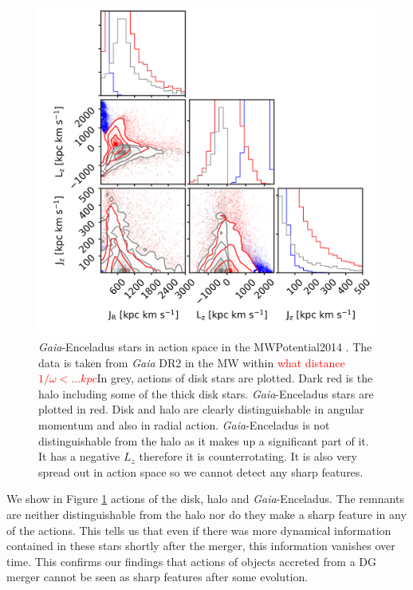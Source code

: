 \begin{figure}[htbp]
    \centering
    \includegraphics[width=1.0\textwidth]{plots/Discussion/Gaia_all_actions.png}
    \caption{\textit{Gaia}-Enceladus stars in action space in the MWPotential2014 \citep{Bovy...galpy...2015}. The data is taken from \textit{Gaia} DR2 \citep{GaiaDR2...overview...2018} in the \ac{MW} within \textcolor{red}{what distance $1/\omega <...kpc$}In grey, actions of disk stars are plotted. Dark red is the halo including some of the thick disk stars. \textit{Gaia}-Enceladus stars are plotted in red. Disk and halo are clearly distinguishable in angular momentum and also in radial action. \textit{Gaia}-Enceladus is not distinguishable from the halo as it makes up a significant part of it. It has a negative $L_z$ therefore it is counterrotating. It is also very spread out in action space so we cannot detect any sharp features.}
    \label{fig:Gaia_Enceladus_actions}
\end{figure}
We show in Figure \ref{fig:Gaia_Enceladus_actions} actions of the disk, halo and \textit{Gaia}-Enceladus. The remnants are neither distinguishable from the halo nor do they make a sharp feature in any of the actions. This tells us that even if there was more dynamical information contained in these stars shortly after the merger, this information vanishes over time. This confirms our findings that actions of objects accreted from a \ac{DG} merger cannot be seen as sharp features after some evolution. 


